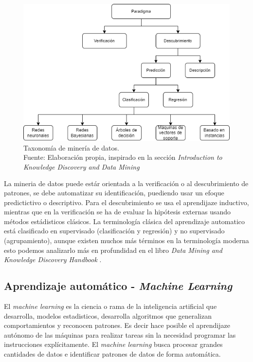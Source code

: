 \begin{figure}[H]
    \centering
    \includegraphics[width=\textwidth]{figures/chapter02/data-mining-taxonomy.drawio.png}
    \caption{Taxonomía de minería de datos.\\Fuente: Elaboración propia, inspirado en la sección \textit{Introduction to Knowledge Discovery and Data Mining} \cite{maimon2005data}}
    \label{fig:data-mining-taxonomy}
\end{figure}

La mineria de datos puede estár orientada a la verificación o al descubrimiento de patrones, se debe automatizar su identificación, puediendo usar un efoque predictictivo o descriptivo. Para el descubrimiento se usa el aprendijaze inductivo, mientras que en la verificación se ha de evaluar la hipótesis externas usando métodos estádisticos clásicos. La terminología clásica del aprendizaje automatico está clasificado en supervisado (clasificación y regresión) y no supervisado (agrupamiento), aunque existen muchos más términos en la terminología moderna esto podemos analizarlo más en profundidad en el libro \textit{Data Mining and Knowledge Discovery Handbook} \cite{maimon2005data}.


\subsection{Aprendizaje automático - \textit{Machine Learning}}

El \textit{machine learning} es la ciencia o rama de la inteligencia artificial que desarrolla, modelos estadisticos, desarrolla algoritmos que generalizan comportamientos y reconocen patrones. Es decir hace posible el aprendijaze autónomo de las máquinas para realizar tareas sin la necesidad programar las instrucciones explícitamente. El \textit{machine learning} busca procesar grandes cantidades de datos e identificar patrones de datos de forma automática.

